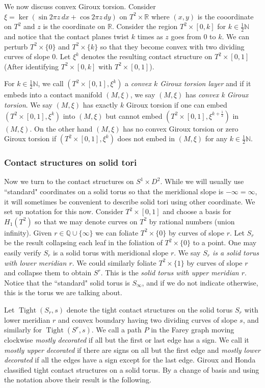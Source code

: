 \documentclass[11pt]{amsart}
\theoremstyle{plain}
\theoremstyle{definition}
\theoremstyle{remark}
\numberwithin{theorem}{section}
\newcommand{\dfn}[1]{{\em #1}}        %
\newcommand{\R}{\mathbb{R}}           %
\newcommand{\Q}{\mathbb{Q}}           %
\newcommand{\N}{\mathbb{N}}           %
\DeclareMathOperator{\Tight}{Tight}
\begin{document}
We now discuss convex Giroux torsion. Consider $\xi=\ker(\sin2\pi z\, dx+\cos2\pi z\,  dy)$ on $T^2\times\R$ where $(x,y)$ is the cooordinate on $T^2$ and $z$ is the coordinate on $\R$. Consider the region $T^2\times[0,k]$ for $k\in\frac{1}{2}\N$ and notice that the contact planes twist $k$ times as $z$ goes from $0$ to $k$. We can perturb $T^2\times \{0\}$ and $T^2\times\{k\}$ so that they become convex with two dividing curves of slope $0$. Let $\xi^k$ denotes the resulting contact structure on $T^2\times[0,1]$ (After identifying $T^2\times [0,k]$ with $T^2\times [0,1]$). 

For $k \in \frac12\N$, we call $(T^2\times[0,1],\xi^k)$ a {\it convex $k$ Giroux torsion layer} and if it embeds into a contact manifold $(M,\xi)$, we say $(M,\xi)$ has {\it convex k Giroux torsion}. We say $(M,\xi)$ has exactly $k$ Giroux torsion if one can embed $(T^2\times[0,1],\xi^k)$ into $(M,\xi)$ but cannot embed $(T^2\times[0,1],\xi^{k+\frac{1}{2}})$ in $(M,\xi)$. On the other hand $(M,\xi)$ has no convex Giroux torsion or zero Giroux torsion if $(T^2\times[0,1],\xi^k)$ does not embed in $(M,\xi)$ for any $k\in\frac{1}{2}\N$.

\subsubsection{Contact structures on solid tori}\label{conttori}
Now we turn to the contact structures on $S^1\times D^2$. While we will usually use ``standard" coordinates on a solid torus so that the meridional slope is $-\infty=\infty$, it will sometimes be convenient to describe solid tori using other coordinate. We set up notation for this now. Consider $T^2\times [0,1]$ and choose a basis for $H_1(T^2)$ so that we may denote curves on $T^2$ by rational numbers (union infinity). Given $r\in\Q\cup\{\infty\}$ we can foliate $T^2\times \{0\}$ by curves of slope $r$. Let $S_r$ be the result collapsing each leaf in the foliation of $T^2\times \{0\}$ to a point. One may easily verify $S_r$ is a solid torus with meridional slope $r$. We say \dfn{$S_r$ is a solid torus with lower meridian $r$}. We could similarly foliate $T^2\times\{1\}$ by curves of slope $r$ and collapse them to obtain $S^r$. This is the \dfn{solid torus with upper meridian $r$}. Notice that the ``standard" solid torus is $S_\infty$, and if we do not indicate otherwise, this is the torus we are talking about. 

Let $\Tight(S_r,s)$ denote the tight contact structures on the solid torus $S_r$ with lower meridian $r$ and convex boundary having two dividing curves of slope $s$, and similarly for $\Tight(S^r,s)$. We call a path $P$ in the Farey graph moving clockwise \dfn{mostly decorated} if all but the first or last edge has a sign. We call it \dfn{mostly upper decorated} if there are signs on all but the first edge and \dfn{mostly lower decorated} if all the edges have a sign except for the last edge. 
Giroux \cite{Giroux2} and Honda \cite{Honda00a} classified tight contact structures on a solid torus. By a change of basis and using the notation above their result is the following. 
\end{document}
